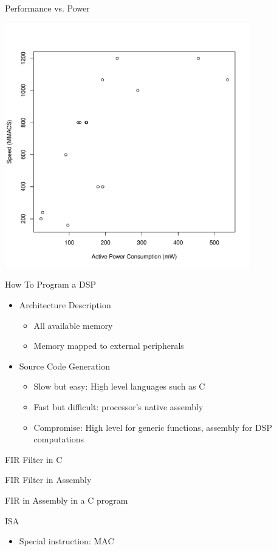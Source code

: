 \documentclass{beamer}
\begin{document}
\begin{frame}{Performance vs. Power}
    \begin{center}
        \includegraphics[width=0.8\textwidth]{power_perf.pdf}
    \end{center}
\end{frame}

\begin{frame}{How To Program a DSP}
    \begin{itemize}
        \item Architecture Description
            \begin{itemize}
                \item All available memory
                \item Memory mapped to external peripherals
            \end{itemize}
        \item Source Code Generation
            \begin{itemize}
                \item Slow but easy: High level languages such as C
                \item Fast but difficult: processor's native assembly
                \item Compromise: High level for generic functions, assembly for DSP computations
            \end{itemize}
    \end{itemize}
\end{frame}

\begin{frame}{FIR Filter in C}
\end{frame}

\begin{frame}{FIR Filter in Assembly}
\end{frame}

\begin{frame}{FIR in Assembly in a C program}
\end{frame}

\begin{frame}{ISA}
    \begin{itemize}
        \item Special instruction: MAC
    \end{itemize}
\end{frame}
\end{document}
